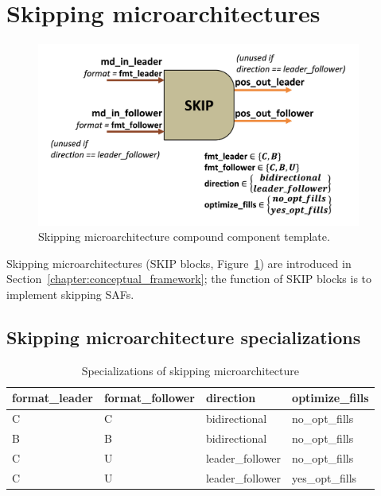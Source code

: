 


\section{Skipping microarchitectures}

\begin{figure}[H]
    \centering
    \includegraphics[width=0.95\textwidth]{figures/SKIP.png}
    \caption{Skipping microarchitecture compound component template.}
    \label{fig:SKIP}
\end{figure}

Skipping microarchitectures (SKIP blocks, Figure~\ref{fig:SKIP}) are introduced in Section~\ref{chapter:conceptual_framework}; the function of SKIP blocks is to implement skipping SAFs.

\subsection{Skipping microarchitecture specializations}

\begin{table}[ht]
\centering
\begin{tabular}{llll}
\toprule
 format\_leader   & format\_follower   & direction       & optimize\_fills   \\
\midrule
 C               & C                 & bidirectional   & no\_opt\_fills     \\
 B               & B                 & bidirectional   & no\_opt\_fills     \\
 C               & U                 & leader\_follower & no\_opt\_fills     \\
 C               & U                 & leader\_follower & yes\_opt\_fills    \\
\bottomrule
\end{tabular}
\caption{Specializations of skipping microarchitecture}
\label{tab:Skipping microarchitecture_specializations}
\end{table}


